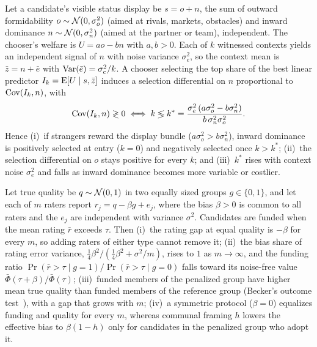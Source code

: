 \begin{proposition}\label{prop:direction}
Let a candidate's visible status display be $s=o+n$, the sum of outward formidability $o\sim\mathcal{N}(0,\sigma_o^2)$ (aimed at rivals, markets, obstacles) and inward dominance $n\sim\mathcal{N}(0,\sigma_n^2)$ (aimed at the partner or team), independent. The chooser's welfare is $U=ao-bn$ with $a,b>0$. Each of $k$ witnessed contexts yields an independent signal of $n$ with noise variance $\sigma_e^2$, so the context mean is $\bar z=n+\bar e$ with $\operatorname{Var}(\bar e)=\sigma_e^2/k$. A chooser selecting the top share of the best linear predictor $I_k=\operatorname{E}[U\mid s,\bar z]$ induces a selection differential on $n$ proportional to $\operatorname{Cov}(I_k,n)$, with
\begin{equation}
\operatorname{Cov}(I_k,n)\gtrless 0\iff k\lessgtr k^*=\frac{\sigma_e^2\,(a\sigma_o^2-b\sigma_n^2)}{b\,\sigma_n^2\sigma_o^2}.\label{eq:kstar}
\end{equation}
Hence (i)~if strangers reward the display bundle ($a\sigma_o^2>b\sigma_n^2$), inward dominance is positively selected at entry ($k=0$) and negatively selected once $k>k^*$; (ii)~the selection differential on $o$ stays positive for every $k$; and (iii)~$k^*$ rises with context noise $\sigma_e^2$ and falls as inward dominance becomes more variable or costlier.
\end{proposition}

\begin{proposition}\label{prop:sharedbias}
Let true quality be $q\sim\mathcal{N}(0,1)$ in two equally sized groups $g\in\{0,1\}$, and let each of $m$ raters report $r_j=q-\beta g+e_j$, where the bias $\beta>0$ is common to all raters and the $e_j$ are independent with variance $\sigma^2$. Candidates are funded when the mean rating $\bar r$ exceeds $\tau$. Then (i)~the rating gap at equal quality is $-\beta$ for every $m$, so adding raters of either type cannot remove it; (ii)~the bias share of rating error variance, $\tfrac14\beta^2/(\tfrac14\beta^2+\sigma^2/m)$, rises to $1$ as $m\to\infty$, and the funding ratio $\Pr(\bar r>\tau\mid g=1)/\Pr(\bar r>\tau\mid g=0)$ falls toward its noise-free value $\bar\Phi(\tau+\beta)/\bar\Phi(\tau)$; (iii)~funded members of the penalized group have higher mean true quality than funded members of the reference group (Becker's outcome test~\cite{becker1957}), with a gap that grows with $m$; (iv)~a symmetric protocol ($\beta=0$) equalizes funding and quality for every $m$, whereas communal framing $h$ lowers the effective bias to $\beta(1-h)$ only for candidates in the penalized group who adopt it.
\end{proposition}

